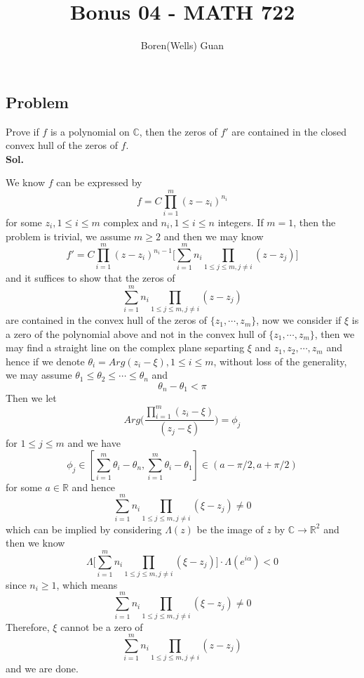 \documentclass[lang=en,11pt,a4paper,citestyle =authoryear]{elegantpaper}
\title{Bonus 04 - MATH 722}
\author{Boren(Wells) Guan}
\newcommand{\R}{\mathbb{R}}
\newcommand{\C}{\mathbb{C}}
\begin{document}
\maketitle

\subsection*{Problem} 
Prove if $f$ is a polynomial on $\C$, then the zeros of $f'$ are contained in the closed convex hull of the zeros of $f$.
\vspace{0.5em}\\
\textbf{Sol.} \par
We know $f$ can be expressed by
\[f = C\prod_{i=1}^m (z-z_i)^{n_i}\]
for some $z_i, 1\leq i \leq m$ complex and $n_i,1\leq i \leq n$ integers. If $m = 1$, then the problem is trivial, we assume $m\geq 2$ and then we may know
\[
  f' = C\prod_{i=1}^m (z-z_i)^{n_i-1}\Big[\sum\limits_{i=1}^m n_i\prod_{1\leq j \leq m, j\neq i}(z-z_j)\Big]
\]
and it suffices to show that the zeros of
\[
\sum\limits_{i=1}^m n_i\prod_{1\leq j \leq m, j\neq i}(z-z_j)
\]
are contained in the convex hull of the zeros of $\{z_1,\cdots,z_m\}$, now we consider if $\xi$ is a zero of the polynomial above and not in the convex hull of $\{z_1,\cdots,z_m\}$, then we may find a straight line on the complex plane separting $\xi$ and $z_1,z_2,\cdots,z_m$ and hence if we denote $\theta_i = Arg(z_i - \xi), 1\leq i \leq m$, without loss of the generality, we may assume $\theta_1  \leq \theta_2 \leq \cdots \leq \theta_n$ and
\[\theta_n-\theta_1 < \pi\]
Then we let
\[
Arg\Big(\dfrac{\prod_{i=1}^m (z_i - \xi)}{(z_j - \xi)}\Big)  = \phi_j
\]
for $1\leq j \leq m$ and we have
\[
\phi_j \in [\sum\limits_{i=1}^m \theta_i - \theta_n, \sum\limits_{i=1}^m \theta_i - \theta_1] \in (a-\pi/2,a+\pi/2)
\]
for some $a \in \R$ and hence
\[\sum\limits_{i=1}^m n_i\prod_{1\leq j \leq m, j\neq i}(\xi-z_j) \neq 0\]
which can be implied by considering $\Lambda(z)$ be the image of $z$ by $\C\to\R^2$ and then we know
\[
\Lambda\Big[\sum\limits_{i=1}^m n_i\prod_{1\leq j \leq m, j\neq i}(\xi-z_j)\Big] \cdot \Lambda(e^{i\alpha}) < 0
\]
since $n_i \geq 1$, which means
\[\sum\limits_{i=1}^m n_i\prod_{1\leq j \leq m, j\neq i}(\xi-z_j) \neq 0\]
Therefore, $\xi$ cannot be a zero of
\[
\sum\limits_{i=1}^m n_i\prod_{1\leq j \leq m, j\neq i}(z-z_j)
\]
and we are done.
\vspace{0.5em}

\addappheadtotoc
\end{document}
